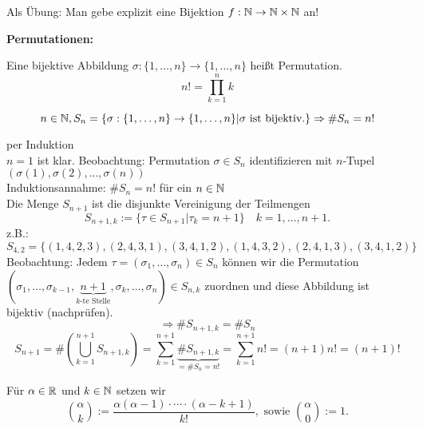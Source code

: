 \documentclass[../ana1.tex]{subfiles}
\begin{document}
\begin{bem}
	Als Übung: Man gebe explizit eine Bijektion \(f : \mathbb{N} \rightarrow \mathbb{N} \times \mathbb{N} \) an!
\end{bem}

\textbf{Permutationen:}
\begin{defi}
	Eine bijektive Abbildung \(\sigma : \{1,\ldots,n\} \rightarrow \{1,\ldots,n\} \) heißt Permutation.
	\[n! = \prod_{k=1}^{n}k\]
\end{defi}

\begin{satz}
	\[n\in\mathbb{N}, S_n = \{\sigma: \{1,\ldots,n\}\rightarrow \{1,\ldots,n\} | \sigma \text{ ist bijektiv.}\} \Rightarrow \# S_n = n!\]
\end{satz}
\begin{bew} per Induktion\\
	\(n = 1\) ist klar.
	Beobachtung: Permutation \(\sigma \in S_n\) identifizieren mit \(n\)-Tupel \( (\sigma(1), \sigma(2), \ldots, \sigma(n)) \) \\
	Induktionsannahme: \( \# S_n = n!\) für ein \(n\in\mathbb{N} \) \\
	Die Menge \(S_{n+1}\) ist die disjunkte Vereinigung der Teilmengen
	\[S_{n+1, k} := \{\tau \in S_{n+1} | \tau_k = n+1 \} \quad k = 1,\ldots, n+1.\]
	z.B.: \[S_{4,2} = \{ (1,4,2,3), (2,4,3,1), (3,4,1,2), (1,4,3,2), (2,4,1,3), (3,4,1,2) \} \]
	Beobachtung: Jedem \(\tau = (\sigma_1,\ldots,\sigma_n)\in S_n\) können wir die Permutation \( (\sigma_1, \ldots, \sigma_{k-1}, \underbrace{n+1}_{k\text{-te Stelle}}, \sigma_k, \ldots, \sigma_n) \in S_{n,k} \) zuordnen und diese Abbildung ist bijektiv (nachprüfen).
	\[\Rightarrow \# S_{n+1,k} = \# S_n \]
	\[ S_{n+1} = \# (\bigcup_{k=1}^{n+1} S_{n+1,k} ) = \sum_{k=1}^{n+1} \underbrace{\# S_{n+1,k}}_{=\#S_n = n!} = \sum_{k=1}^{n+1} n! = (n+1)n! = (n+1)! \]
\end{bew}

\begin{defi}[Binomialkoeffizient]
	Für \(\alpha \in\mathbb{R} \) und \( k\in\mathbb{N} \) setzen wir
	\[ \binom{\alpha}{k} := \frac{\alpha(\alpha-1)\cdot\cdots\cdot(\alpha-k+1)}{k!}, \text{ sowie } \binom{\alpha}{0} := 1. \]
\end{defi}
\end{document}
